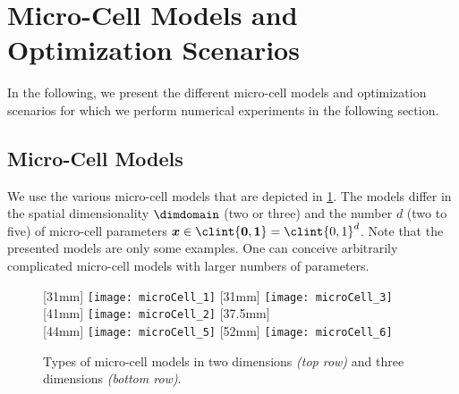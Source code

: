 \section{Micro-Cell Models and Optimization Scenarios}
\label{sec:63models}


\noindent
In the following, we present the different micro-cell models
and optimization scenarios for which we perform numerical
experiments in the following section.



\subsection{Micro-Cell Models}
\label{sec:631models}

We use the various micro-cell models that are depicted in \cref{fig:microCell}.
The models differ in the spatial dimensionality $\dimdomain$ (two or three)
and the number $d$ (two to five) of micro-cell parameters
$\*x \in \clint{\*0, \*1} = \clint{0, 1}^d$.
Note that the presented models are only some examples.
One can conceive arbitrarily complicated micro-cell models
with larger numbers of parameters.

\begin{figure}
  [31mm]{%
    \texttt{[image: microCell\_1]}%
  }%
  \hfill%
  [31mm]{%
    \texttt{[image: microCell\_3]}%
  }%
  \hfill%
  [41mm]{%
    \texttt{[image: microCell\_2]}%
  }%
  \hfill%
  [37.5mm]{%
    \hspace*{-45mm}%
  }\\[2mm]%
  [44mm]{%
    \texttt{[image: microCell\_5]}%
  }%
  \qquad%
  [52mm]{%
    \texttt{[image: microCell\_6]}%
  }%
  \caption[Types of micro-cell models]{%
    Types of micro-cell models in two dimensions \emph{(top row)}
    and three dimensions \emph{(bottom row)}.%
  }%
  \label{fig:microCell}%
\end{figure}

